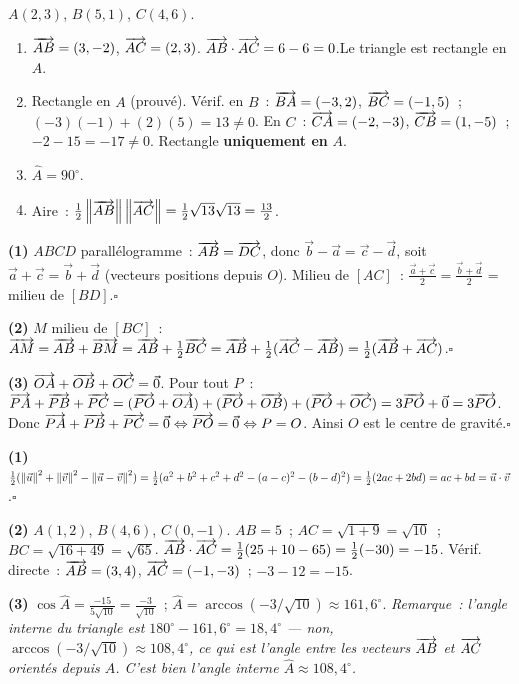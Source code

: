$A(2,3)$, $B(5,1)$, $C(4,6)$.
\begin{enumerate}
  \item $\overrightarrow{AB}=(3,-2)$, $\overrightarrow{AC}=(2,3)$.
        $\overrightarrow{AB}\cdot\overrightarrow{AC}=6-6=0$.\checkmark\quad Le triangle est rectangle en $A$.
  \item Rectangle en $A$ (prouv\'e). V\'erif. en $B$~: $\overrightarrow{BA}=(-3,2)$, $\overrightarrow{BC}=(-1,5)$~;
        $(-3)(-1)+(2)(5)=13\ne0$. En $C$~: $\overrightarrow{CA}=(-2,-3)$, $\overrightarrow{CB}=(1,-5)$~;
        $-2-15=-17\ne0$. Rectangle \textbf{uniquement en} $A$.
  \item $\hat{A}=90^{\circ}$.
  \item Aire~: $\frac{1}{2}\left\|\overrightarrow{AB}\right\|\left\|\overrightarrow{AC}\right\|=\frac{1}{2}\sqrt{13}\sqrt{13}=\frac{13}{2}$.
\end{enumerate}


\textbf{(1)} $ABCD$ parall\'elogramme~: $\overrightarrow{AB}=\overrightarrow{DC}$, donc $\vec{b}-\vec{a}=\vec{c}-\vec{d}$,
soit $\vec{a}+\vec{c}=\vec{b}+\vec{d}$ (vecteurs positions depuis $O$).
Milieu de $[AC]$~: $\frac{\vec{a}+\vec{c}}{2}=\frac{\vec{b}+\vec{d}}{2}$ = milieu de $[BD]$.\hfill$\square$

\textbf{(2)} $M$ milieu de $[BC]$~: $\overrightarrow{AM}=\overrightarrow{AB}+\overrightarrow{BM}=\overrightarrow{AB}+\frac{1}{2}\overrightarrow{BC}
=\overrightarrow{AB}+\frac{1}{2}(\overrightarrow{AC}-\overrightarrow{AB})=\frac{1}{2}(\overrightarrow{AB}+\overrightarrow{AC})$.\hfill$\square$

\textbf{(3)} $\overrightarrow{OA}+\overrightarrow{OB}+\overrightarrow{OC}=\vec{0}$. Pour tout $P$~:
$\overrightarrow{PA}+\overrightarrow{PB}+\overrightarrow{PC}=(\overrightarrow{PO}+\overrightarrow{OA})+(\overrightarrow{PO}+\overrightarrow{OB})+(\overrightarrow{PO}+\overrightarrow{OC})
=3\overrightarrow{PO}+\vec{0}=3\overrightarrow{PO}$.
Donc $\overrightarrow{PA}+\overrightarrow{PB}+\overrightarrow{PC}=\vec{0}\Leftrightarrow\overrightarrow{PO}=\vec{0}\Leftrightarrow P=O$.
Ainsi $O$ est le centre de gravité.\hfill$\square$


\textbf{(1)} $\frac{1}{2}(\left\|\vec{u}\right\|^2+\left\|\vec{v}\right\|^2-\left\|\vec{u}-\vec{v}\right\|^2)
=\frac{1}{2}(a^2+b^2+c^2+d^2-(a-c)^2-(b-d)^2)
=\frac{1}{2}(2ac+2bd)=ac+bd=\vec{u}\cdot\vec{v}$.\hfill$\square$

\textbf{(2)} $A(1,2)$, $B(4,6)$, $C(0,-1)$.
$AB=5$~; $AC=\sqrt{1+9}=\sqrt{10}$~; $BC=\sqrt{16+49}=\sqrt{65}$.
$\overrightarrow{AB}\cdot\overrightarrow{AC}=\frac{1}{2}(25+10-65)=\frac{1}{2}(-30)=-15$.
V\'erif. directe~: $\overrightarrow{AB}=(3,4)$, $\overrightarrow{AC}=(-1,-3)$~; $-3-12=-15$.\checkmark

\textbf{(3)} $\cos\hat{A}=\frac{-15}{5\sqrt{10}}=\frac{-3}{\sqrt{10}}$~;
$\hat{A}=\arccos(-3/\sqrt{10})\approx161{,}6^{\circ}$.
\emph{Remarque~: l'angle interne du triangle est $180^{\circ}-161{,}6^{\circ}=18{,}4^{\circ}$ --- non,
$\arccos(-3/\sqrt{10})\approx108{,}4^{\circ}$, ce qui est l'angle entre les vecteurs
$\overrightarrow{AB}$ et $\overrightarrow{AC}$ orient\'es depuis $A$. C'est bien l'angle interne
$\hat{A}\approx108{,}4^{\circ}$.}

